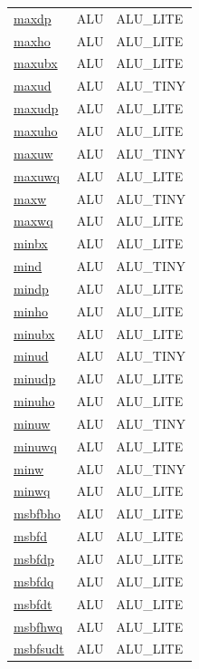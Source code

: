 \begin{small}
\begin{longtable}[l]{l l l}
\hyperlink{lvx.maxdp}{maxdp} & ALU & ALU\_LITE \\ 
\hyperlink{lvx.maxho}{maxho} & ALU & ALU\_LITE \\ 
\hyperlink{lvx.maxubx}{maxubx} & ALU & ALU\_LITE \\ 
\hyperlink{lvx.maxud}{maxud} & ALU & ALU\_TINY \\ 
\hyperlink{lvx.maxudp}{maxudp} & ALU & ALU\_LITE \\ 
\hyperlink{lvx.maxuho}{maxuho} & ALU & ALU\_LITE \\ 
\hyperlink{lvx.maxuw}{maxuw} & ALU & ALU\_TINY \\ 
\hyperlink{lvx.maxuwq}{maxuwq} & ALU & ALU\_LITE \\ 
\hyperlink{lvx.maxw}{maxw} & ALU & ALU\_TINY \\ 
\hyperlink{lvx.maxwq}{maxwq} & ALU & ALU\_LITE \\ 
\hyperlink{lvx.minbx}{minbx} & ALU & ALU\_LITE \\ 
\hyperlink{lvx.mind}{mind} & ALU & ALU\_TINY \\ 
\hyperlink{lvx.mindp}{mindp} & ALU & ALU\_LITE \\ 
\hyperlink{lvx.minho}{minho} & ALU & ALU\_LITE \\ 
\hyperlink{lvx.minubx}{minubx} & ALU & ALU\_LITE \\ 
\hyperlink{lvx.minud}{minud} & ALU & ALU\_TINY \\ 
\hyperlink{lvx.minudp}{minudp} & ALU & ALU\_LITE \\ 
\hyperlink{lvx.minuho}{minuho} & ALU & ALU\_LITE \\ 
\hyperlink{lvx.minuw}{minuw} & ALU & ALU\_TINY \\ 
\hyperlink{lvx.minuwq}{minuwq} & ALU & ALU\_LITE \\ 
\hyperlink{lvx.minw}{minw} & ALU & ALU\_TINY \\ 
\hyperlink{lvx.minwq}{minwq} & ALU & ALU\_LITE \\ 
\hyperlink{lvx.msbfbho}{msbfbho} & ALU & ALU\_LITE \\ 
\hyperlink{lvx.msbfd}{msbfd} & ALU & ALU\_LITE \\ 
\hyperlink{lvx.msbfdp}{msbfdp} & ALU & ALU\_LITE \\ 
\hyperlink{lvx.msbfdq}{msbfdq} & ALU & ALU\_LITE \\ 
\hyperlink{lvx.msbfdt}{msbfdt} & ALU & ALU\_LITE \\ 
\hyperlink{lvx.msbfhwq}{msbfhwq} & ALU & ALU\_LITE \\ 
\hyperlink{lvx.msbfsudt}{msbfsudt} & ALU & ALU\_LITE \\ 

\end{longtable}
\end{small}
